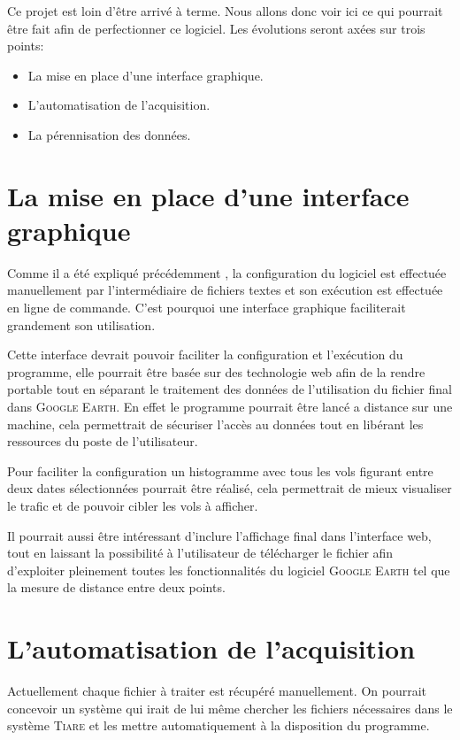 \label{evolution}
Ce projet est loin d'être arrivé à terme. Nous allons donc voir ici ce qui pourrait être fait afin de perfectionner ce logiciel. Les évolutions seront axées sur trois points:
\begin{itemize}
    \item La mise en place d'une interface graphique.
    \item L'automatisation de l'acquisition.
    \item La pérennisation des données.
\end{itemize}

\section{La mise en place d'une interface graphique}
Comme il a été expliqué précédemment , la configuration du logiciel est effectuée manuellement par l'intermédiaire de fichiers textes et son exécution est effectuée en ligne de commande. C'est pourquoi une interface graphique faciliterait grandement son utilisation.

Cette interface devrait pouvoir faciliter la configuration et l'exécution du programme, elle pourrait être basée sur des technologie web afin de la rendre portable tout en séparant le traitement des données de l'utilisation du fichier final dans \textsc{Google Earth}. En effet le programme pourrait être lancé a distance sur une machine, cela permettrait de sécuriser l'accès au données tout en libérant les ressources du poste de l'utilisateur.

Pour faciliter la configuration un histogramme avec tous les vols figurant entre deux dates sélectionnées pourrait être réalisé, cela permettrait de mieux visualiser le trafic et de pouvoir cibler les vols à afficher.

Il pourrait aussi être intéressant d'inclure l'affichage final dans l'interface web, tout en laissant la possibilité à l'utilisateur de télécharger le fichier afin d'exploiter pleinement toutes les fonctionnalités du logiciel \textsc{Google Earth} tel que la mesure de distance entre deux points.

\section{L'automatisation de l'acquisition}
Actuellement chaque fichier à traiter est récupéré manuellement. On pourrait concevoir un système qui irait de lui même chercher les fichiers nécessaires dans le système \textsc{Tiare} et les mettre automatiquement à la disposition du programme.


